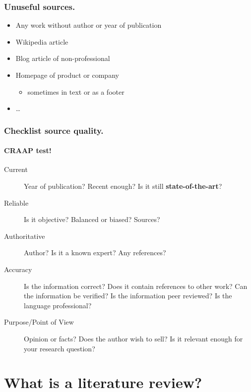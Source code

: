 \documentclass[aspectratio=169]{beamer}
\begin{document}
\begin{frame}
    \frametitle{Unuseful sources.}

    \begin{itemize}
        \item Any work without author or year of publication
        \item Wikipedia article
        \item Blog article of non-professional
        \item Homepage of product or company
              \begin{itemize}
                  \item sometimes in text or as a footer
              \end{itemize}
        \item \dots
    \end{itemize}
\end{frame}

\begin{frame}
    \frametitle{Checklist source quality.}
    \framesubtitle{CRAAP test!}

    \begin{description}
        \item[Current] Year of publication? Recent enough? Is it still \textbf{state-of-the-art}?
        \item[Reliable] Is it objective? Balanced or biased? Sources?
        \item[Authoritative] Author? Is it a known expert? Any references?
        \item[Accuracy] Is the information correct? Does it contain references to other work? Can the information be verified? Is the information peer reviewed? Is the language professional?
        \item[Purpose/Point of View] Opinion or facts? Does the author wish to sell? Is it relevant enough for your research question?
    \end{description}

\end{frame}



\section{What is a literature review?}
\end{document}
